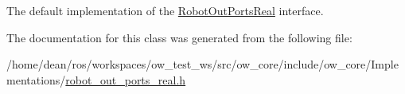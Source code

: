 The default implementation of the \hyperlink{classow__core_1_1RobotOutPortsReal}{Robot\+Out\+Ports\+Real} interface. 

The documentation for this class was generated from the following file\+:\begin{DoxyCompactItemize}
\item 
/home/dean/ros/workspaces/ow\+\_\+test\+\_\+ws/src/ow\+\_\+core/include/ow\+\_\+core/\+Implementations/\hyperlink{robot__out__ports__real_8h}{robot\+\_\+out\+\_\+ports\+\_\+real.\+h}\end{DoxyCompactItemize}
